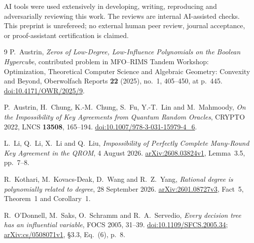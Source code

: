 \documentclass[11pt]{article}
\begin{document}
AI tools were used extensively in developing, writing, reproducing and
adversarially reviewing this work. The reviews are internal AI-assisted
checks. This preprint is unrefereed; no external human peer review,
journal acceptance, or proof-assistant certification is claimed.

\begin{thebibliography}{9}
P.~Austrin, \emph{Zeros of Low-Degree, Low-Influence Polynomials on the
Boolean Hypercube}, contributed problem in
MFO--RIMS Tandem Workshop: Optimization, Theoretical Computer Science
and Algebraic Geometry: Convexity and Beyond,
Oberwolfach Reports \textbf{22} (2025), no.~1, 405--450, at p.~445.
\href{https://doi.org/10.4171/OWR/2025/9}{doi:10.4171/OWR/2025/9}.

P.~Austrin, H.~Chung, K.-M.~Chung, S.~Fu, Y.-T.~Lin and M.~Mahmoody,
\emph{On the Impossibility of Key Agreements from Quantum Random Oracles},
CRYPTO 2022, LNCS \textbf{13508}, 165--194.
\href{https://doi.org/10.1007/978-3-031-15979-4_6}{doi:10.1007/978-3-031-15979-4\_6}.

L.~Li, Q.~Li, X.~Li and Q.~Liu,
\emph{Impossibility of Perfectly Complete Many-Round Key Agreement
in the QROM}, 4 August 2026.
\href{https://arxiv.org/abs/2608.03824v1}{arXiv:2608.03824v1},
Lemma~3.5, pp.~7--8.

R.~Kothari, M.~Kovacs-Deak, D.~Wang and R.~Z.~Yang,
\emph{Rational degree is polynomially related to degree},
28 September 2026.
\href{https://arxiv.org/abs/2601.08727v3}{arXiv:2601.08727v3},
Fact~5, Theorem~1 and Corollary~1.

R.~O'Donnell, M.~Saks, O.~Schramm and R.~A.~Servedio,
\emph{Every decision tree has an influential variable},
FOCS 2005, 31--39.
\href{https://doi.org/10.1109/SFCS.2005.34}{doi:10.1109/SFCS.2005.34};
\href{https://arxiv.org/abs/cs/0508071v1}{arXiv:cs/0508071v1},
\S3.3, Eq.~(6), p.~8.
\end{thebibliography}
\end{document}
